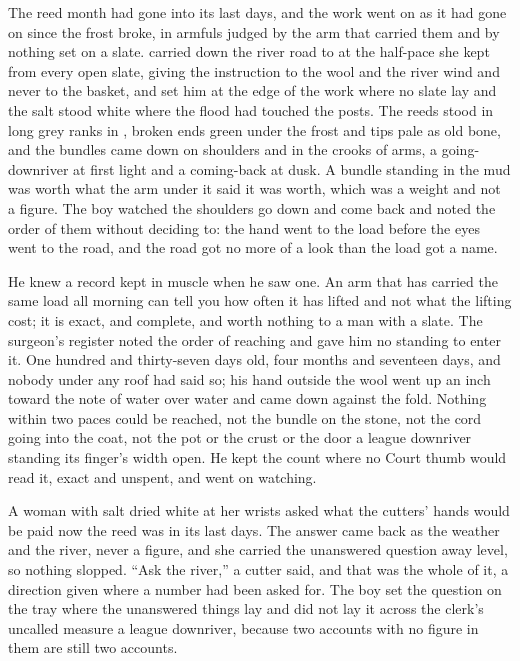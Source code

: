 
The reed month had gone into its last days, and the work went on as it had gone on since the frost broke, in armfuls judged by the arm that carried them and by nothing set on a slate.  carried  down the river road to  at the half-pace she kept from every open slate, giving the instruction to the wool and the river wind and never to the basket, and set him at the edge of the work where no slate lay and the salt stood white where the flood had touched the posts. The reeds stood in long grey ranks in , broken ends green under the frost and tips pale as old bone, and the bundles came down on shoulders and in the crooks of arms, a going-downriver at first light and a coming-back at dusk. A bundle standing in the mud was worth what the arm under it said it was worth, which was a weight and not a figure. The boy watched the shoulders go down and come back and noted the order of them without deciding to: the hand went to the load before the eyes went to the road, and the road got no more of a look than the load got a name.

He knew a record kept in muscle when he saw one. An arm that has carried the same load all morning can tell you how often it has lifted and not what the lifting cost; it is exact, and complete, and worth nothing to a man with a slate. The surgeon's register noted the order of reaching and gave him no standing to enter it. One hundred and thirty-seven days old, four months and seventeen days, and nobody under any roof had said so; his hand outside the wool went up an inch toward the note of water over water and came down against the fold. Nothing within two paces could be reached, not the bundle on the stone, not the cord going into the coat, not the pot or the crust or the door a league downriver standing its finger's width open. He kept the count where no Court thumb would read it, exact and unspent, and went on watching.

A woman with salt dried white at her wrists asked what the cutters' hands would be paid now the reed was in its last days. The answer came back as the weather and the river, never a figure, and she carried the unanswered question away level, so nothing slopped. “Ask the river,” a cutter said, and that was the whole of it, a direction given where a number had been asked for. The boy set the question on the tray where the unanswered things lay and did not lay it across the clerk's uncalled measure a league downriver, because two accounts with no figure in them are still two accounts.

